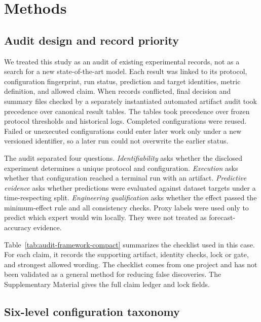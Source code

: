 \section{Methods}
\label{sec:methods}

\subsection{Audit design and record priority}
\label{sec:methods-audit-design}

We treated this study as an audit of existing experimental records, not as a search for a new state-of-the-art model.  Each result was linked to its protocol, configuration fingerprint, run status, prediction and target identities, metric definition, and allowed claim.  When records conflicted, final decision and summary files checked by a separately instantiated automated artifact audit took precedence over canonical result tables.  The tables took precedence over frozen protocol thresholds and historical logs.  Completed configurations were reused.  Failed or unexecuted configurations could enter later work only under a new versioned identifier, so a later run could not overwrite the earlier status.

The audit separated four questions.  \emph{Identifiability} asks whether the disclosed experiment determines a unique protocol and configuration.  \emph{Execution} asks whether that configuration reached a terminal run with an artifact.  \emph{Predictive evidence} asks whether predictions were evaluated against dataset targets under a time-respecting split.  \emph{Engineering qualification} asks whether the effect passed the minimum-effect rule and all consistency checks.  Proxy labels were used only to predict which expert would win locally.  They were not treated as forecast-accuracy evidence.



Table~\ref{tab:audit-framework-compact} summarizes the checklist used in this case.  For each claim, it records the supporting artifact, identity checks, lock or gate, and strongest allowed wording.  The checklist comes from one project and has not been validated as a general method for reducing false discoveries.  The Supplementary Material gives the full claim ledger and lock fields.

\subsection{Six-level configuration taxonomy}
\label{sec:methods-taxonomy}

